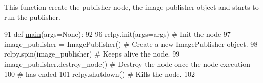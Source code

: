 This function create the publisher node, the image publisher object and starts to run the publisher. 


\begin{DoxyCode}
91 \textcolor{keyword}{def }\mbox{\hyperlink{namespacetoxic__vision_1_1webcam__pub_a0d57aeae4d44f1dcb33eed5082cf3c87}{main}}(args=None):
92     
96     rclpy.init(args=args) \textcolor{comment}{# Init the node}
97     image\_publisher = ImagePublisher() \textcolor{comment}{# Create a new ImagePublisher object.}
98     rclpy.spin(image\_publisher) \textcolor{comment}{# Keeps alive the node.}
99     image\_publisher.destroy\_node() \textcolor{comment}{# Destroy the node once the node execution }
100     \textcolor{comment}{# has ended}
101     rclpy.shutdown() \textcolor{comment}{# Kills the node.}
102   
\end{DoxyCode}
